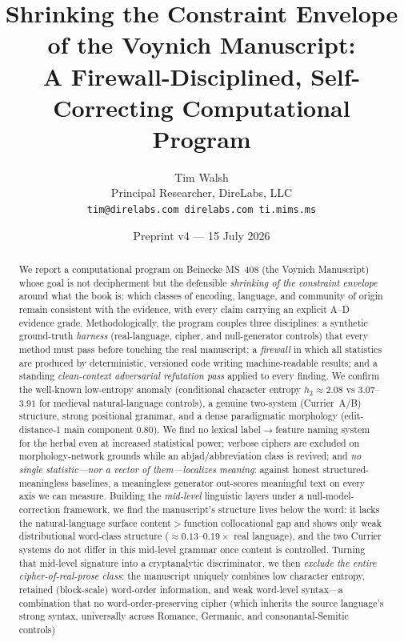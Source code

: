 \documentclass[11pt]{article}
\title{\textbf{Shrinking the Constraint Envelope of the Voynich Manuscript:\\
A Firewall-Disciplined, Self-Correcting Computational Program}}
\author{Tim Walsh \\ \small Principal Researcher, DireLabs, LLC \\
\small \texttt{tim@direlabs.com \quad direlabs.com \quad ti.mims.ms}}
\date{Preprint v4 --- 15 July 2026}
\begin{document}
\maketitle

\begin{abstract}
\noindent We report a computational program on Beinecke MS~408 (the Voynich
Manuscript) whose goal is not decipherment but the defensible \emph{shrinking of the
constraint envelope} around what the book is: which classes of encoding, language,
and community of origin remain consistent with the evidence, with every claim carrying
an explicit A--D evidence grade. Methodologically, the program couples three
disciplines: a synthetic ground-truth \emph{harness} (real-language, cipher, and
null-generator controls) that every method must pass before touching the real
manuscript; a \emph{firewall} in which all statistics are produced by deterministic,
versioned code writing machine-readable results; and a standing \emph{clean-context
adversarial refutation pass} applied to every finding. We confirm the well-known
low-entropy anomaly (conditional character entropy $h_2\approx 2.08$ vs
$3.07$--$3.91$ for medieval natural-language controls), a genuine two-system
(Currier~A/B) structure, strong positional grammar, and a dense paradigmatic
morphology (edit-distance-1 main component $0.80$). We find no lexical
label$\rightarrow$feature naming system for the herbal even at increased statistical
power; verbose ciphers are excluded on morphology-network grounds while an
abjad/abbreviation class is revived; and \emph{no single statistic---nor a vector of
them---localizes meaning}: against honest structured-meaningless baselines, a
meaningless generator out-scores meaningful text on every axis we can measure. Building
the \emph{mid-level} linguistic layers under a null-model-correction framework, we find
the manuscript's structure lives below the word: it lacks the natural-language surface
content$>$function collocational gap and shows only weak distributional word-class
structure ($\approx\!0.13$--$0.19\times$ real language), and the two Currier systems do
not differ in this mid-level grammar once content is controlled. Turning that mid-level
signature into a cryptanalytic discriminator, we then \emph{exclude the entire
cipher-of-real-prose class}: the manuscript uniquely combines low character entropy,
retained (block-scale) word-order information, and weak word-level syntax---a
combination that no word-order-preserving cipher (which inherits the source language's
strong syntax, universally across Romance, Germanic, and consonantal-Semitic controls)

\end{abstract}
\end{document}
